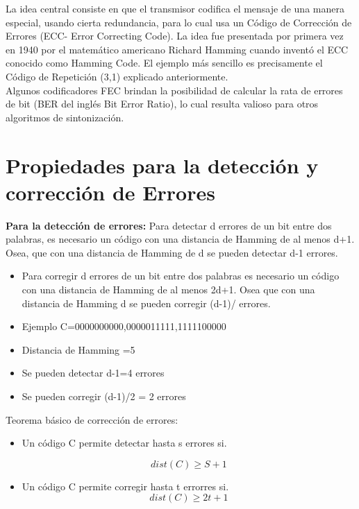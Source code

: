 La idea central consiste en que el transmisor codifica el mensaje de una manera especial, usando cierta redundancia, para lo cual usa un Código de Corrección de Errores (ECC- Error Correcting Code). La idea fue presentada por primera vez en 1940 por el matemático americano Richard Hamming cuando inventó el ECC conocido como Hamming Code.
El ejemplo más sencillo es precisamente el Código de Repetición (3,1) explicado anteriormente.\\

Algunos codificadores FEC brindan la posibilidad de calcular la rata de errores de bit (BER del inglés Bit Error Ratio), lo cual resulta valioso para otros algoritmos de sintonización. \\

\section{Propiedades para la detección y corrección de Errores}

\textbf{Para la detección de errores:} Para detectar d errores de un bit entre dos palabras, es necesario un código con una distancia de Hamming de al menos d+1. Osea, que con una distancia de Hamming de d se pueden detectar d-1 errores.

\begin{itemize}
    \item Para corregir d errores de un bit entre dos palabras es necesario un código con una distancia de Hamming de al menos 2d+1. Osea que con una distancia de Hamming d se pueden corregir (d-1)/ errores. 
    \item Ejemplo C={0000000000,0000011111,1111100000}
    \item Distancia de Hamming =5
    \item Se pueden detectar d-1=4 errores
    \item Se pueden corregir (d-1)/2 = 2 errores 
\end{itemize}

Teorema básico de corrección de errores:

\begin{itemize}
    \item Un código C permite detectar hasta s errores si.
    
    \begin{equation} \label{capsiete_veinticuatro}
dist(C) \geq S+1
     \end{equation}
     
    \item Un código C permite corregir hasta t errorres si.
    \begin{equation} \label{capsiete_veinticinco}
dist(C) \geq 2t+1
    \end{equation}
     
\end{itemize}

